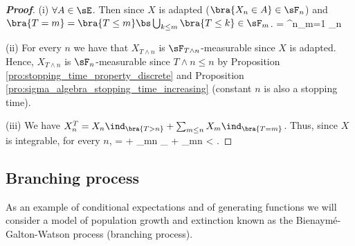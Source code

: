\begin{proof}[\bf Proof]
\ben
\item [(i)] $\forall A \in \sE$. Then since $X$ is adapted ($\bra{X_n \in A} \in \sF_n$) and $\bra{T = m} = \bra{T \leq m} \bs \bigcup_{k\leq m} \bra{T \leq k} \in \sF_m$.
\be
{} \cap {} = \bigcup^n_{m=1}  \cap {} \in \sF_n
\ee

\item [(ii)] For every $n$ we have that $X_{T\land n}$ is $\sF_{T\land n}$-measurable since $X$ is adapted. Hence, $X_{T\land n}$ is $\sF_n$-measurable since $T \land n \leq n$ by Proposition \ref{pro:stopping_time_property_discrete} and Proposition \ref{pro:sigma_algebra_stopping_time_increasing} (constant $n$ is also a stopping time).
\item [(iii)] We have $X_n^T = X_n \ind_{\bra{T>n}} + \sum_{m\leq n}X_m \ind_{\bra{T=m}}$. Thus, since $X$ is integrable, for every $n$,
\be
\E{} = \E{} \leq \E{} + \sum_{m\leq n} \ind_{} \leq \E{} + \sum_{m\leq n} < \infty.
\ee


\een
\end{proof}

\subsection{Branching process}

As an example of conditional expectations and of generating functions we will consider a model of population growth and extinction known as the Bienaym\'e-Galton-Watson process (branching process).

